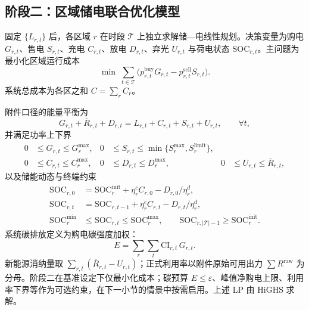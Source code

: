 \documentclass[UTF8,a4paper,zihao=-4]{ctexart}
\begin{document}
\subsection{阶段二：区域储电联合优化模型}

固定 $\{L_{r,t}\}$ 后，各区域 $r$ 在时段 $\mathcal{T}$ 上独立求解储—电线性规划。决策变量为购电 $G_{r,t}$、售电 $S_{r,t}$、充电 $C_{r,t}$、放电 $D_{r,t}$、弃光 $U_{r,t}$ 与荷电状态 $\mathrm{SOC}_{r,t}$。主问题为最小化区域运行成本
\begin{equation}
\min\;
\sum_{t\in\mathcal{T}}
\bigl(
p^{\mathrm{buy}}_{r,t}G_{r,t}
-
p^{\mathrm{sell}}_{r,t}S_{r,t}
\bigr).
\end{equation}
系统总成本为各区之和 $C=\sum_r C_r$。

附件口径的能量平衡为
\begin{equation}
G_{r,t}+\overline{R}_{r,t}+D_{r,t}
=
L_{r,t}+C_{r,t}+S_{r,t}+U_{r,t},
\qquad
\forall t,
\end{equation}
并满足功率上下界
\begin{equation}
\begin{aligned}
0&\le G_{r,t}\le G^{\max}_r,
&
0&\le S_{r,t}\le \min\{S^{\max}_r,S^{\mathrm{limit}}_r\},
\\
0&\le C_{r,t}\le C^{\max}_r,
&
0&\le D_{r,t}\le D^{\max}_r,
&
0&\le U_{r,t}\le \overline{R}_{r,t},
\end{aligned}
\end{equation}
以及储能动态与终端约束
\begin{equation}
\begin{aligned}
\mathrm{SOC}_{r,0}
&=
\mathrm{SOC}^{\mathrm{init}}_r+\eta^c_r C_{r,0}-D_{r,0}/\eta^d_r,
\\
\mathrm{SOC}_{r,t}
&=
\mathrm{SOC}_{r,t-1}+\eta^c_r C_{r,t}-D_{r,t}/\eta^d_r,
\\
\mathrm{SOC}^{\min}_r
&\le
\mathrm{SOC}_{r,t}
\le
\mathrm{SOC}^{\max}_r,
\qquad
\mathrm{SOC}_{r,|\mathcal{T}|-1}
\ge
\mathrm{SOC}^{\mathrm{init}}_r.
\end{aligned}
\end{equation}
系统碳排放定义为购电碳强度加权：
\begin{equation}
E
=
\sum_{r}\sum_{t}
\mathrm{CI}_{r,t}\,G_{r,t}.
\end{equation}
新能源消纳量取 $\sum_{r,t}(\overline{R}_{r,t}-U_{r,t})$；正式利用率以附件原始可用出力 $\sum R^{\mathrm{raw}}$ 为分母。阶段二在基准设定下仅最小化成本；碳预算 $E\le\varepsilon$、峰值净购电上限、利用率下界等作为可选约束，在下一小节的情景中按需启用。上述 LP 由 HiGHS 求解。
\end{document}
